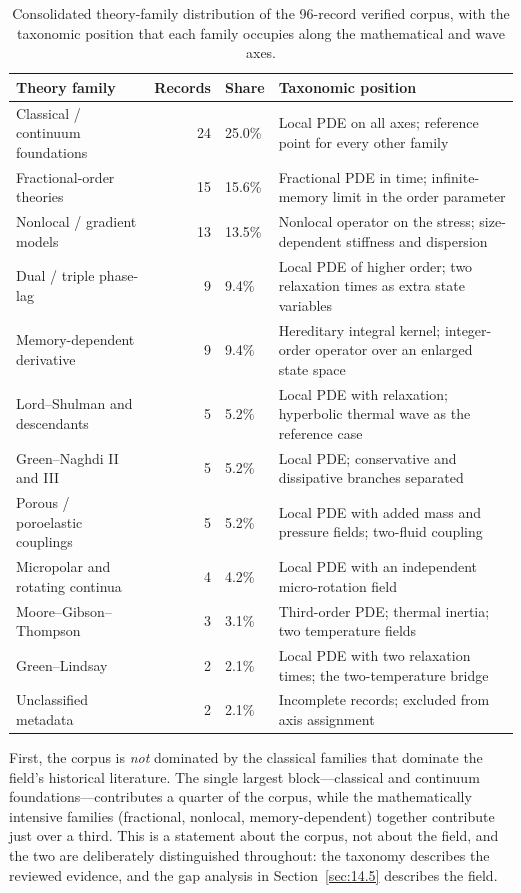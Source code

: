 \begin{table}[h]
\centering
\small
\caption{Consolidated theory-family distribution of the 96-record verified corpus, with the taxonomic position that each family occupies along the mathematical and wave axes.}
\label{tab:taxonomy_distribution}
\begin{tabularx}{\textwidth}{@{}lrlX@{}}
\toprule
\textbf{Theory family} & \textbf{Records} & \textbf{Share} & \textbf{Taxonomic position} \\
\midrule
Classical / continuum foundations & 24 & 25.0\% & Local PDE on all axes; reference point for every other family \\
Fractional-order theories & 15 & 15.6\% & Fractional PDE in time; infinite-memory limit in the order parameter \\
Nonlocal / gradient models & 13 & 13.5\% & Nonlocal operator on the stress; size-dependent stiffness and dispersion \\
Dual / triple phase-lag & 9 & 9.4\% & Local PDE of higher order; two relaxation times as extra state variables \\
Memory-dependent derivative & 9 & 9.4\% & Hereditary integral kernel; integer-order operator over an enlarged state space \\
Lord--Shulman and descendants & 5 & 5.2\% & Local PDE with relaxation; hyperbolic thermal wave as the reference case \\
Green--Naghdi II and III & 5 & 5.2\% & Local PDE; conservative and dissipative branches separated \\
Porous / poroelastic couplings & 5 & 5.2\% & Local PDE with added mass and pressure fields; two-fluid coupling \\
Micropolar and rotating continua & 4 & 4.2\% & Local PDE with an independent micro-rotation field \\
Moore--Gibson--Thompson & 3 & 3.1\% & Third-order PDE; thermal inertia; two temperature fields \\
Green--Lindsay & 2 & 2.1\% & Local PDE with two relaxation times; the two-temperature bridge \\
Unclassified metadata & 2 & 2.1\% & Incomplete records; excluded from axis assignment \\
\bottomrule
\end{tabularx}
\end{table}

First, the corpus is \emph{not} dominated by the classical families that dominate the field's historical literature. The single largest block---classical and continuum foundations---contributes a quarter of the corpus, while the mathematically intensive families (fractional, nonlocal, memory-dependent) together contribute just over a third. This is a statement about the corpus, not about the field, and the two are deliberately distinguished throughout: the taxonomy describes the reviewed evidence, and the gap analysis in Section~\ref{sec:14.5} describes the field.

